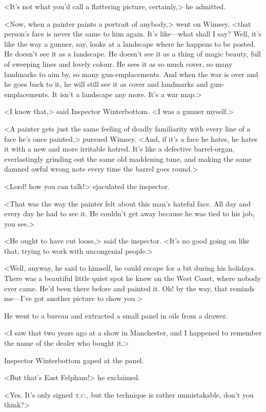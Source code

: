 <It's not what you'd call a flattering picture, certainly,> he admitted.

<Now, when a painter paints a portrait of anybody,> went on Wimsey, <that person's face is never the same to him again. It's like—what shall I say? Well, it's like the way a gunner, say, looks at a landscape where he happens to be posted. He doesn't see it as a landscape. He doesn't see it as a thing of magic beauty, full of sweeping lines and lovely colour. He sees it as so much cover, so many landmarks to aim by, so many gun-emplacements. And when the war is over and he goes back to it, he will still see it as cover and landmarks and gun-emplacements. It isn't a landscape any more. It's a war map.>

<I know that,> said Inspector Winterbottom. <I was a gunner myself.>

<A painter gets just the same feeling of deadly familiarity with every line of a face he's once painted,> pursued Wimsey. <And, if it's a face he hates, he hates it with a new and more irritable hatred. It's like a defective barrel-organ, everlastingly grinding out the same old maddening tune, and making the same damned awful wrong note every time the barrel goes round.>

<Lord! how you can talk!> ejaculated the inspector.

<That was the way the painter felt about this man's hateful face. All day and every day he had to see it. He couldn't get away because he was tied to his job, you see.>

<He ought to have cut loose,> said the inspector. <It's no good going on like that, trying to work with uncongenial people.>

<Well, anyway, he said to himself, he could escape for a bit during his holidays. There was a beautiful little quiet spot he knew on the West Coast, where nobody ever came. He'd been there before and painted it. Oh! by the way, that reminds me—I've got another picture to show you.>

He went to a bureau and extracted a small panel in oils from a drawer.

<I saw that two years ago at a show in Manchester, and I happened to remember the name of the dealer who bought it.>

Inspector Winterbottom gaped at the panel.

<But that's East Felpham!> he exclaimed.

<Yes. It's only signed \textsc{t.c.}, but the technique is rather unmistakable, don't you think?>

